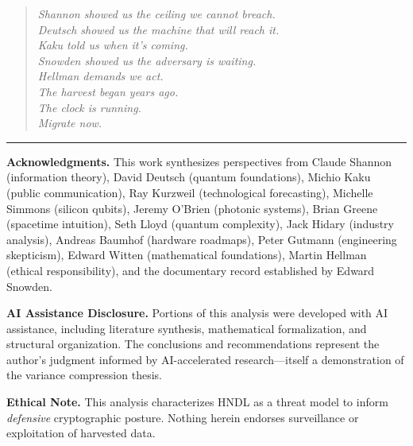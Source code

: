 \documentclass[11pt,a4paper]{article}
\begin{document}
\begin{quote}
\textit{Shannon showed us the ceiling we cannot breach.\\
Deutsch showed us the machine that will reach it.\\
Kaku told us when it's coming.\\
Snowden showed us the adversary is waiting.\\
Hellman demands we act.\\[0.5em]
The harvest began years ago.\\
The clock is running.\\
Migrate now.}
\end{quote}

\vspace{2em}
\hrule
\vspace{1em}

\noindent\textbf{Acknowledgments.} This work synthesizes perspectives from Claude Shannon (information theory), David Deutsch (quantum foundations), Michio Kaku (public communication), Ray Kurzweil (technological forecasting), Michelle Simmons (silicon qubits), Jeremy O'Brien (photonic systems), Brian Greene (spacetime intuition), Seth Lloyd (quantum complexity), Jack Hidary (industry analysis), Andreas Baumhof (hardware roadmaps), Peter Gutmann (engineering skepticism), Edward Witten (mathematical foundations), Martin Hellman (ethical responsibility), and the documentary record established by Edward Snowden.

\vspace{0.5em}
\noindent\textbf{AI Assistance Disclosure.} Portions of this analysis were developed with AI assistance, including literature synthesis, mathematical formalization, and structural organization. The conclusions and recommendations represent the author's judgment informed by AI-accelerated research---itself a demonstration of the variance compression thesis.

\vspace{0.5em}
\noindent\textbf{Ethical Note.} This analysis characterizes HNDL as a threat model to inform \textit{defensive} cryptographic posture. Nothing herein endorses surveillance or exploitation of harvested data.
\end{document}

